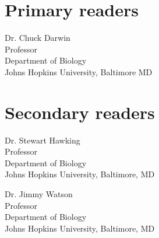 

\Blindtext[3]



\begin{singlespace}

    \section*{Primary readers}
    
    Dr. Chuck Darwin \\
    Professor\\
    Department of Biology\\
    Johns Hopkins University, Baltimore MD 


    \section*{Secondary readers}
    
    Dr. Stewart Hawking\\
    Professor\\
    Department of Biology \\
    Johns Hopkins University, Baltimore, MD 
    
    \vspace{0.1in}
    
    Dr. Jimmy Watson \\
    Professor\\
    Department of Biology \\
    Johns Hopkins University, Baltimore, MD 



\end{singlespace}